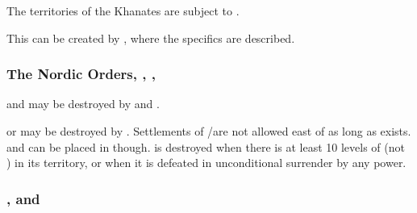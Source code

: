  The territories of the Khanates
are subject to .

 This \MIN can be created by
, where the specifics are described.

\subsubsection{The Nordic Orders, , , }
 \hfill {} 
\bparag {} and  may be destroyed by
 and .

 \hfill {} 
\bparag {} or  may be destroyed by
.
\label{chSpecific:Siberia} \hfill
{}
\bparag Settlements of \TP/\COL are not allowed east of
 as long as  exists. \TP and \COL
can be placed in  though.
\bparag {} is destroyed when there is at least 10 levels of
\COL (not \TP) in its territory, or when it is defeated in unconditional
surrender by any power.

\subsubsection{, 
  and }

